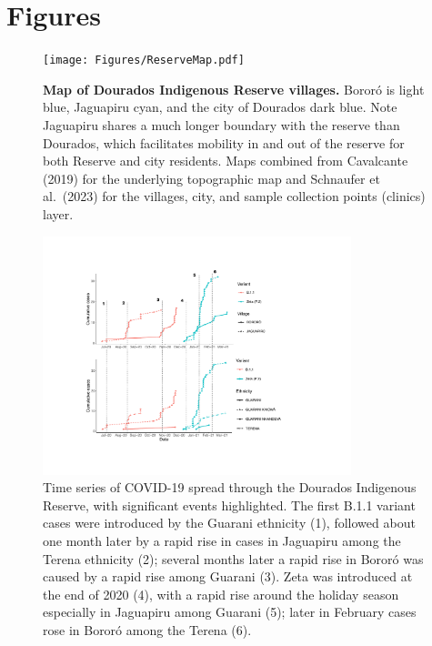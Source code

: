 \documentclass[
  letterpaper,
  abstract]{scrartcl}
\begin{document}
\section{Figures}

\begin{figure}[H]

\centering
\caption{\textbf{Map of Dourados Indigenous Reserve villages.} Bororó is light
blue, Jaguapiru cyan, and the city of Dourados dark blue. Note
Jaguapiru shares a much longer boundary with the reserve than Dourados,
which facilitates mobility in and out of the reserve for both Reserve
and city residents. Maps combined from Cavalcante (2019) for the underlying
topographic map and Schnaufer et al.~(2023) for the villages, city, and 
sample collection points (clinics) layer.}
\label{fig:Map}
\vspace{0.3em}
{\texttt{[image: Figures/ReserveMap.pdf]}}
\end{figure}%


\begin{figure}[H]
\caption{Time series of COVID-19 spread through the Dourados Indigenous
Reserve, with significant events highlighted. The first B.1.1 variant
cases were introduced by the Guarani ethnicity (1), followed about one
month later by a rapid rise in cases in Jaguapiru among the Terena
ethnicity (2); several months later a rapid rise in Bororó was caused by
a rapid rise among Guarani (3). Zeta was introduced at the end of 2020
(4), with a rapid rise around the holiday season especially in Jaguapiru
among Guarani (5); later in February cases rose in Bororó among the
Terena (6).}
\label{fig:DeOliveiraSeries}
\vspace{0.3em}
{\centering \includegraphics[width=0.8\textwidth,height=\textheight]{Figures/Time Series.pdf}

}
\end{figure}%
\end{document}
